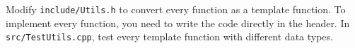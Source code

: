 Modify \verb+include/Utils.h+ to convert every function as a template function. 
To implement every function, you need to write the code directly in the header. 
In \verb+src/TestUtils.cpp+, test every template function with different data types.


%
